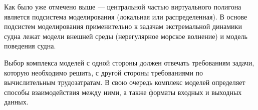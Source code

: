 %

Как было уже отмечено выше --- центральной частью виртуального полигона является 
подсистема моделирования (локальная или распределенная). В основе подсистем моделирования 
применительно к задачам экстремальной динамики судна лежат модели внешней среды 
(нерегулярное морское волнение) и модель поведения судна. 

Выбор комплекса моделей с одной стороны должен отвечать требованиям задачи, которую необходимо решить, 
с другой стороны требованиями по вычислительным трудозатратам. В свою очередь комплекс моделей определяет
способы взаимодействия между ними, а также форматы входных и выходных данных.
